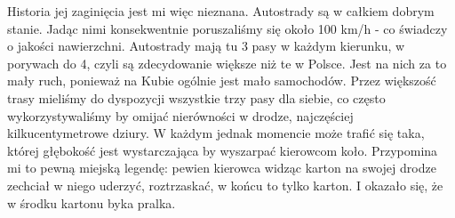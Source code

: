 Historia jej zaginięcia jest mi więc nieznana.
Autostrady są w całkiem dobrym stanie.
Jadąc nimi konsekwentnie poruszaliśmy się około 100 km/h - co świadczy o jakości nawierzchni.
Autostrady mają tu 3 pasy w każdym kierunku, w porywach do 4, czyli są zdecydowanie większe niż te w Polsce.
Jest na nich za to mały ruch, ponieważ na Kubie ogólnie jest mało samochodów.
Przez większość trasy mieliśmy do dyspozycji wszystkie trzy pasy dla siebie, co często wykorzystywaliśmy by omijać nierówności w drodze, najczęściej kilkucentymetrowe dziury.
W każdym jednak momencie może trafić się taka, której głębokość jest wystarczająca by wyszarpać kierowcom koło.
Przypomina mi to pewną miejską legendę: pewien kierowca widząc karton na swojej drodze zechciał w niego uderzyć, roztrzaskać, w końcu to tylko karton.
I okazało się, że w środku kartonu byka pralka. 

